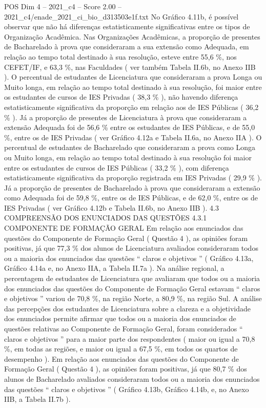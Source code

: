 \begin{textsample}{POS Dim 4 – 2021\_c4 – Score 2.00 – 2021\_c4/enade\_2021\_ci\_bio\_d313503e1f.txt}
No Gráfico 4.11b, é possível observar que não há diferenças estatisticamente significativas entre os tipos de Organização Acadêmica.
Nas Organizações Acadêmicas, a proporção de presentes de Bacharelado à prova que consideraram a sua extensão como Adequada, em relação ao tempo total destinado à sua resolução, esteve entre 55,6 \%, nos CEFET/IF, e 63,3 \%, nas Faculdades ( ver também Tabela II.6b, no Anexo IIB ).
O percentual de estudantes de Licenciatura que consideraram a prova Longa ou Muito longa, em relação ao tempo total destinado à sua resolução, foi maior entre os estudantes de cursos de IES Privadas ( 38,3 \% ), não havendo diferença estatisticamente significativa da proporção em relação aos de IES Públicas ( 36,2 \% ).
Já a proporção de presentes de Licenciatura à prova que consideraram a extensão Adequada foi de 56,6 \% entre os estudantes de IES Públicas, e de 55,0 \%, entre os de IES Privadas ( ver Gráfico 4.12a e Tabela II.6a, no Anexo IIA ).
O percentual de estudantes de Bacharelado que consideraram a prova como Longa ou Muito longa, em relação ao tempo total destinado à sua resolução foi maior entre os estudantes de cursos de IES Públicas ( 33,2 \% ), com diferença estatisticamente significativa da proporção registrada em IES Privadas ( 29,9 \% ).
Já a proporção de presentes de Bacharelado à prova que consideraram a extensão como Adequada foi de 59,8 \%, entre os de IES Públicas, e de 62,0 \%, entre os de IES Privadas ( ver Gráfico 4.12b e Tabela II.6b, no Anexo IIB ). 4.3 COMPREENSÃO DOS ENUNCIADOS DAS QUESTÕES 4.3.1 COMPONENTE DE FORMAÇÃO GERAL Em relação aos enunciados das questões do Componente de Formação Geral ( Questão 4 ), as opiniões foram positivas, já que 77,3 \% dos alunos de Licenciatura avaliados consideraram todos ou a maioria dos enunciados das questões “ claros e objetivos ” ( Gráfico 4.13a, Gráfico 4.14a e, no Anexo IIA, a Tabela II.7a ).
Na análise regional, a percentagem de estudantes de Licenciatura que avaliaram que todos ou a maioria dos enunciados das questões do Componente de Formação Geral estavam “ claros e objetivos ” variou de 70,8 \%, na região Norte, a 80,9 \%, na região Sul.
A análise das percepções dos estudantes de Licenciatura sobre a clareza e a objetividade dos enunciados permite afirmar que todos ou a maioria dos enunciados de questões relativas ao Componente de Formação Geral, foram considerados “ claros e objetivos ” para a maior parte dos respondentes ( maior ou igual a 70,8 \%, em todas as regiões, e maior ou igual a 67,5 \%, em todos os quartos de desempenho ).
Em relação aos enunciados das questões do Componente de Formação Geral ( Questão 4 ), as opiniões foram positivas, já que 80,7 \% dos alunos de Bacharelado avaliados consideraram todos ou a maioria dos enunciados das questões “ claros e objetivos ” ( Gráfico 4.13b, Gráfico 4.14b, e, no Anexo IIB, a Tabela II.7b ).

\end{textsample}
